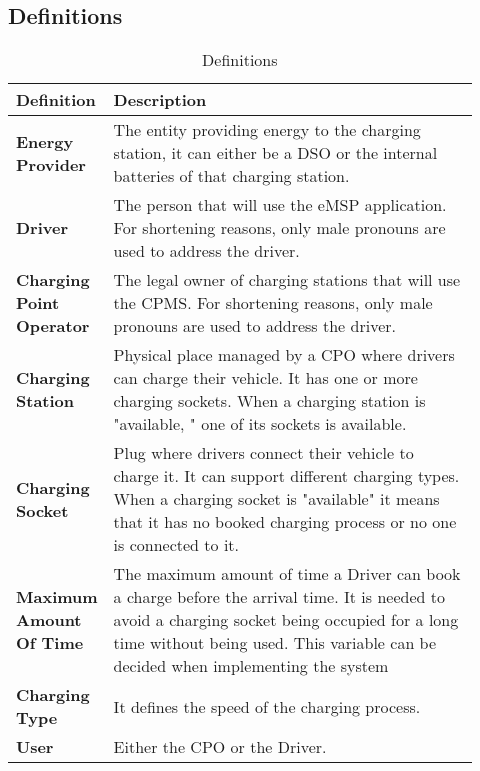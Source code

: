 \subsection{Definitions} %
\label{subsec:definitions}
\begin{table}[H]
\centering 
    \begin{tabular}{| p{0.125\linewidth} | p{0.80\linewidth} |}
    \hline
    \rowcolor{bluepoli!40}
     \textbf{Definition} & \textbf{Description} \T\B \\
    \hline \hline
    \textbf{Energy Provider} & The entity providing energy to the charging station, it can either be a DSO or the internal batteries of that charging station.\T\B\\
    \hline
    \textbf{Driver} & The person that will use the eMSP application. For shortening reasons, only male pronouns are used to address the driver. \T\B\\
    \hline
    \textbf{Charging Point Operator} & The legal owner of charging stations that will use the CPMS. For shortening reasons, only male pronouns are used to address the driver. \T\B\\
    \hline
    \textbf{Charging Station} & Physical place managed by a CPO where drivers can charge their vehicle. It has one or more charging sockets. When a charging station is "available, " one of its sockets is available. \T\B\\
    \hline
    \textbf{Charging Socket} & Plug where drivers connect their vehicle to charge it. It can support different charging types. When a charging socket is "available" it means that it has no booked charging process  or no one is connected to it.\T\B\\
    \hline
    \textbf{Maximum Amount Of Time} & The maximum amount of time a Driver can book a charge before the arrival time. It is needed to avoid a charging socket being occupied for a long time without being used. This variable can be decided when implementing the system \T\B\\
    \hline
    \textbf{Charging Type} & It defines the speed of the charging process.\T\B\\
    \hline
    \textbf{User} & Either the CPO or the Driver.\T\B\\
    \hline
    
    \end{tabular}
    \\[10pt]
    \caption{Definitions}
\end{table}

